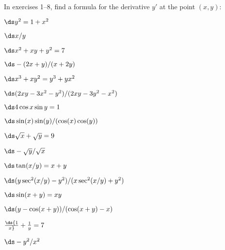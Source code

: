 \begin{exercises}

In exercises 1--8, find a formula for the derivative $y'$ at the point
$(x,y)$:

\begin{exercise} $\ds y^2=1+x^2$
\begin{answer} $\ds x/y$
\end{answer}\end{exercise}

\begin{exercise} $\ds x^2+xy+y^2=7$
\begin{answer} $\ds -(2x+y)/(x+2y)$
\end{answer}\end{exercise}

\begin{exercise} $\ds x^3+xy^2=y^3+yx^2$
\begin{answer} $\ds (2xy-3x^2-y^2)/(2xy-3y^2-x^2)$
\end{answer}\end{exercise}

\begin{exercise}  $\ds 4\cos x \sin y = 1$
\begin{answer} $\ds \sin(x)\sin(y)/(\cos(x)\cos(y))$
\end{answer}\end{exercise}

\begin{exercise} $\ds\sqrt{x} + \sqrt{y} = 9$
\begin{answer} $\ds-\sqrt{y}/\sqrt{x}$
\end{answer}\end{exercise}

\begin{exercise} $\ds \tan(x/y) = x+ y$
 \begin{answer} $\ds (y\sec^2(x/y)-y^2)/(x\sec^2(x/y)+y^2)$
\end{answer}\end{exercise}

\begin{exercise} $\ds \sin (x+y ) =xy$
 \begin{answer} $\ds (y-\cos(x+y))/(\cos(x+y)-x)$
\end{answer}\end{exercise}

\begin{exercise} $\ds{1\over x} + {1\over y} = 7$
\begin{answer} $\ds -y^2/x^2$
\end{answer}\end{exercise}


\end{exercises}
